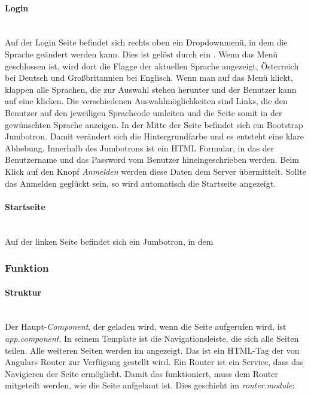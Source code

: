 \paragraph*{Login}\mbox{}\\
Auf der Login Seite befindet sich rechts oben ein Dropdownmenü, in dem die Sprache geändert werden kann. Dies ist gelöst durch ein . Wenn das Menü geschlossen ist, wird dort die Flagge der aktuellen Sprache angezeigt, Österreich bei Deutsch und Großbritannien bei Englisch. Wenn man auf das Menü klickt, klappen alle Sprachen, die zur Auswahl stehen herunter und der Benutzer kann auf eine klicken. Die verschiedenen Auswahlmöglichkeiten sind Links, die den Benutzer auf den jeweiligen Sprachcode umleiten und die Seite somit in der gewünschten Sprache anzeigen. In der Mitte der Seite befindet sich ein Bootstrap Jumbotron. Damit verändert sich die Hintergrundfarbe und es entsteht eine klare Abhebung. Innerhalb des Jumbotrons ist ein \ac{HTML} Formular, in das der Benutzername und das Password vom Benutzer hineingeschrieben werden. Beim Klick auf den Knopf \textit{Anmelden} werden diese Daten dem Server übermittelt. Sollte das Anmelden geglückt sein, so wird automatisch die Startseite angezeigt.

\paragraph*{Startseite}\mbox{}\\
Auf der linken Seite befindet sich ein Jumbotron, in dem 

\subsubsection{Funktion}
\label{sec:ums-client-funktion}

\paragraph*{Struktur} \mbox {}\\
Der Haupt-\textit{Component}, der geladen wird, wenn die Seite aufgerufen wird, ist \textit{app.component}. In seinem Template ist die Navigationsleiste, die sich alle Seiten teilen. Alle weiteren Seiten werden im  angezeigt. Das ist ein \ac{HTML}-Tag der von Angulars Router zur Verfügung gestellt wird. Ein Router ist ein Service, dass das Navigieren der Seite ermöglicht. Damit das funktioniert, muss dem Router mitgeteilt werden, wie die Seite aufgebaut ist. Dies geschieht im \textit{router.module}:

